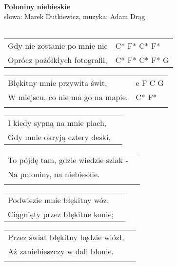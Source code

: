 \documentclass[a5paper]{article}
\begin{document}


\noindent
\noindent
\fontsize{12pt}{15pt}\selectfont
\textbf{Połoniny niebieskie} \\
\fontsize{8pt}{10pt}\selectfont
słowa: Marek Dutkiewicz, muzyka: Adam Drąg \\ \\
\fontsize{10pt}{12pt}\selectfont
{}
\begin{tabular}{@{}p{7.50cm}p{3cm}@{}}
\noindent
Gdy nie zostanie po mnie nic & C* F* C* F* \\
Oprócz pożółkłych fotografii, & C* F* C* F* G \\
\end{tabular}

\begin{tabular}{@{}p{6.50cm}p{3cm}@{}}
Błękitny mnie przywita świt, & e F C G \\
W miejscu, co nie ma go na mapie. & C* F* \\ \\
\end{tabular}

\noindent
\begin{tabular}{@{}p{6.50cm}p{3cm}@{}}
I kiedy sypną na mnie piach, & \\
Gdy mnie okryją cztery deski, & \\
\end{tabular}

\begin{tabular}{@{}p{6.50cm}p{3cm}@{}}
To pójdę tam, gdzie wiedzie szlak - & \\
Na połoniny, na niebieskie. & \\ \\
\end{tabular}

\noindent
\begin{tabular}{@{}p{6.50cm}p{3cm}@{}}
Podwiezie mnie błękitny wóz, & \\
Ciągnięty przez błękitne konie; & \\
\end{tabular}

\begin{tabular}{@{}p{6.50cm}p{3cm}@{}}
Przez świat błękitny będzie wiózł, & \\
Aż zaniebieszczy w dali błonie. & \\ \\
\end{tabular}
\end{document}

